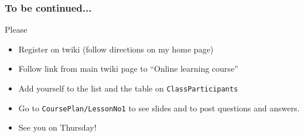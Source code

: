 \documentclass[handout]{beamer}
\begin{document}
\begin{frame}
\frametitle{To be continued...}
Please
\begin{itemize}
\item Register on twiki (follow directions on my home page)
\item Follow link from main twiki page to ``Online learning course''
\item Add yourself to the list and the table on {\tt ClassParticipants}
\item Go to {\tt CoursePlan/LessonNo1} to see slides and to post questions and answers.
\item See you on Thursday!
\end{itemize}
\end{frame}
\end{document}
